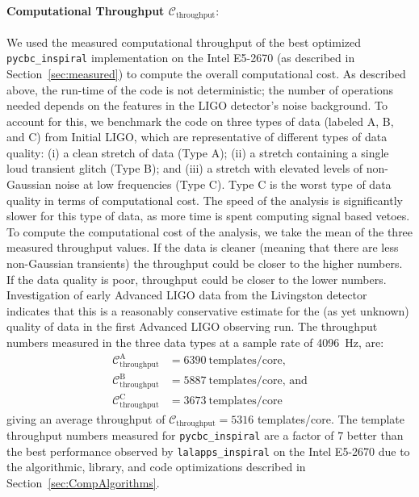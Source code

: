 \vspace*{-15pt}
\paragraph{Computational Throughput $\mathcal{C}_\textrm{throughput}:$} We
used the measured computational throughput of the best optimized
\texttt{pycbc\_inspiral} implementation on the Intel E5-2670 (as described in
Section~\ref{sec:measured}) to compute the overall computational cost.  As
described above, the run-time of the code is not deterministic; the number of
operations needed depends on the features in the LIGO detector's noise
background. To account for this, we benchmark the code on three types of data
(labeled A, B, and C) from Initial LIGO, which are representative of different
types of data quality: (i) a clean stretch of data (Type A); (ii) a stretch
containing a single loud transient glitch (Type B); and (iii) a stretch with
elevated levels of non-Gaussian noise at low frequencies (Type C).  Type C is
the worst type of data quality in terms of computational cost. The speed of
the analysis is significantly slower for this type of data, as more time is
spent computing signal based vetoes.  To compute the computational cost of the
analysis, we take the mean of the three measured throughput values.  If the
data is cleaner (meaning that there are less non-Gaussian transients) the
throughput could be closer to the higher numbers.  If the data quality is
poor, throughput could be closer to the lower numbers.  Investigation of early
Advanced LIGO data from the Livingston detector indicates that this is a
reasonably conservative estimate for the (as yet unknown) quality of data in
the first Advanced LIGO observing run. The throughput numbers measured in the
three data types at a sample rate of 4096~Hz,  are:
\begin{align}
\mathcal{C}_\textrm{throughput}^\textrm{A} &= 6390 \ \textrm{templates/core}, \label{eq:c-clean} \\
\mathcal{C}_\textrm{throughput}^\textrm{B} &= 5887 \ \textrm{templates/core, and} \\
\mathcal{C}_\textrm{throughput}^\textrm{C} &= 3673 \ \textrm{templates/core}
\label{eq:c-grumbly}
\end{align}
giving an average throughput of 
$\mathcal{C}_\textrm{throughput} = 5316$ templates/core. The
template throughput numbers measured for \texttt{pycbc\_inspiral} are a
factor of $7$ better than the best performance observed by
\texttt{lalapps\_inspiral} on the Intel E5-2670 due to the algorithmic,
library, and code optimizations described in Section~\ref{sec:CompAlgorithms}.

